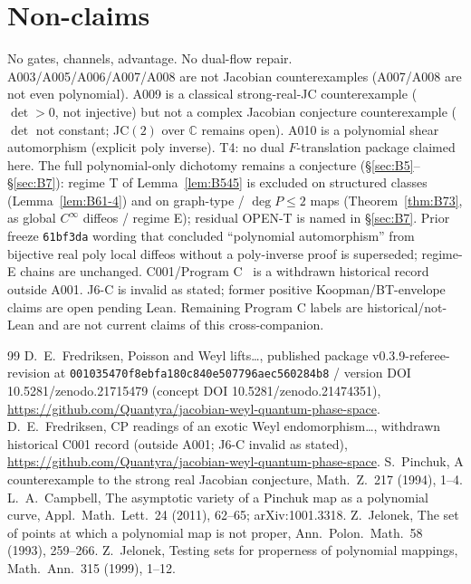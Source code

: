 ﻿\documentclass[11pt]{article}
\begin{document}
\section{Non-claims}
No gates, channels, advantage. No dual-flow repair. A003/A005/A006/A007/A008
are not Jacobian counterexamples (A007/A008 are not even polynomial). A009 is
a classical strong-real-JC counterexample (\(\det>0\), not injective) but not a
complex Jacobian conjecture counterexample (\(\det\) not constant; JC\((2)\) over
\(\mathbb{C}\) remains open). A010 is a polynomial shear automorphism (explicit
poly inverse). T4: no dual \(F\)-translation
package claimed here. The full polynomial-only dichotomy remains a conjecture
(\S\ref{sec:B5}--\S\ref{sec:B7}): regime T of Lemma~\ref{lem:B545} is excluded on
structured classes (Lemma~\ref{lem:B61-4}) and on graph-type / \(\deg P\le 2\)
maps (Theorem~\ref{thm:B73}, as global \(C^\infty\) diffeos / regime E);
residual OPEN-T is named in \S\ref{sec:B7}.
Prior freeze \texttt{61bf3da} wording that concluded ``polynomial automorphism''
from bijective real poly local diffeos without a poly-inverse proof is
superseded; regime-E chains are unchanged.
C001/Program C~\cite{C001} is a withdrawn historical record outside A001.
J6-C is invalid as stated; former positive Koopman/BT-envelope claims are
open pending Lean. Remaining Program C labels are historical/not-Lean and
are not current claims of this cross-companion.

\begin{thebibliography}{99}
D.~E.~Fredriksen, Poisson and Weyl lifts\ldots, published package
v0.3.9-referee-revision at
\texttt{001035470f8ebfa180c840e507796aec560284b8} / version DOI
10.5281/zenodo.21715479 (concept DOI 10.5281/zenodo.21474351),
\url{https://github.com/Quantyra/jacobian-weyl-quantum-phase-space}.
D.~E.~Fredriksen, CP readings of an exotic Weyl endomorphism\ldots,
withdrawn historical C001 record (outside A001; J6-C invalid as stated),
\url{https://github.com/Quantyra/jacobian-weyl-quantum-phase-space}.
S.~Pinchuk, A counterexample to the strong real Jacobian conjecture,
Math.~Z.~217 (1994), 1--4.
L.~A.~Campbell, The asymptotic variety of a Pinchuk map as a polynomial curve,
Appl.~Math.~Lett.~24 (2011), 62--65; arXiv:1001.3318.
Z.~Jelonek, The set of points at which a polynomial map is not proper,
Ann.~Polon.~Math.~58 (1993), 259--266.
Z.~Jelonek, Testing sets for properness of polynomial mappings,
Math.~Ann.~315 (1999), 1--12.
\end{thebibliography}
\end{document}
